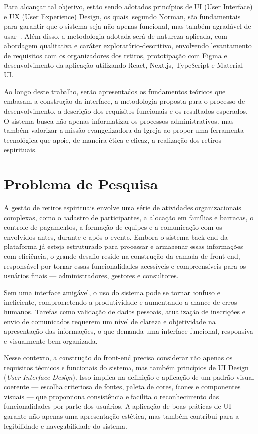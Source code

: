 Para alcançar tal objetivo, estão sendo adotados princípios de UI (User Interface) e UX (User Experience) Design, os quais, segundo Norman, são fundamentais para garantir que o sistema seja não apenas funcional, mas também agradável de usar~\cite{norman2013design}. Além disso, a metodologia adotada será de natureza aplicada, com abordagem qualitativa e caráter exploratório-descritivo, envolvendo levantamento de requisitos com os organizadores dos retiros, prototipação com Figma e desenvolvimento da aplicação utilizando React, Next.js, TypeScript e Material UI.

Ao longo deste trabalho, serão apresentados os fundamentos teóricos que embasam a construção da interface, a metodologia proposta para o processo de desenvolvimento, a descrição dos requisitos funcionais e os resultados esperados. O sistema busca não apenas informatizar os processos administrativos, mas também valorizar a missão evangelizadora da Igreja ao propor uma ferramenta tecnológica que apoie, de maneira ética e eficaz, a realização dos retiros espirituais.


\section{Problema de Pesquisa}

A gestão de retiros espirituais envolve uma série de atividades organizacionais complexas, como o cadastro de participantes, a alocação em famílias e barracas, o controle de pagamentos, a formação de equipes e a comunicação com os envolvidos antes, durante e após o evento. Embora o sistema back-end da plataforma já esteja estruturado para processar e armazenar essas informações com eficiência, o grande desafio reside na construção da camada de front-end, responsável por tornar essas funcionalidades acessíveis e compreensíveis para os usuários finais — administradores, gestores e consultores.

Sem uma interface amigável, o uso do sistema pode se tornar confuso e ineficiente, comprometendo a produtividade e aumentando a chance de erros humanos. Tarefas como validação de dados pessoais, atualização de inscrições e envio de comunicados requerem um nível de clareza e objetividade na apresentação das informações, o que demanda uma interface funcional, responsiva e visualmente bem organizada.

Nesse contexto, a construção do front-end precisa considerar não apenas os requisitos técnicos e funcionais do sistema, mas também princípios de UI Design (\textit{User Interface Design}). Isso implica na definição e aplicação de um padrão visual coerente — escolha criteriosa de fontes, paleta de cores, ícones e componentes visuais — que proporciona consistência e facilita o reconhecimento das funcionalidades por parte dos usuários. A aplicação de boas práticas de UI garante não apenas uma apresentação estética, mas também contribui para a legibilidade e navegabilidade do sistema.

